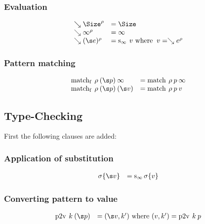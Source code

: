 \subsubsection{Evaluation}

\[
\begin{array}{ll}
\wh \cl{\Size}{\rho} & = \Size \\
\wh \cl{\infty}{\rho} & = \infty  \\
\wh \clp{\s e}{\rho} & = \sinfty \: v \mbox{ where } \: v = \wh \cl{e}{\rho} \\ 
\end{array}
\]



\subsubsection{Pattern matching}
\[
\begin{array}{ll}
\matchf \: \rho \: (\s p) \: \infty & = \match \: \rho \: p \: \infty \\
\matchf \: \rho \: (\s p) \: (\s v) & = \match \: \rho \: p \: v \\
\end{array}
\]

\subsection{Type-Checking}

First the following clauses are added:
\subsubsection{Application of substitution}
\[
\begin{array}{ll}
\subst{\sigma}{\s v} & = \sinfty \subst{\sigma}{v} \\
\end{array}
\]

\subsubsection{Converting pattern to value}
\[
\begin{array}{ll}
\ptvx \: k \: (\s p) & = (\s v,k') \mbox{ where } (v,k') = \ptvx \: k \: p\\
\end{array}
\]

